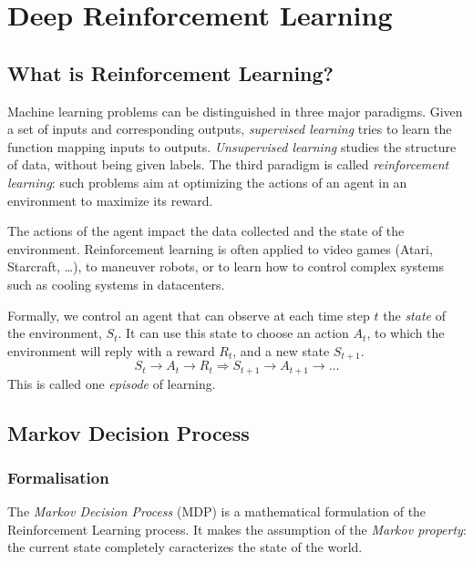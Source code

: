 \section{Deep Reinforcement Learning}
\subsection{What is Reinforcement Learning?}
Machine learning problems can be distinguished in three major paradigms. Given a set of inputs and corresponding outputs, \emph{supervised learning} tries to learn the function mapping inputs to outputs. \emph{Unsupervised learning} studies the structure of data, without being given labels. The third paradigm is called \emph{reinforcement learning}: such problems aim at optimizing the actions of an agent in an environment to maximize its reward.

The actions of the agent impact the data collected and the state of the environment. Reinforcement learning is often applied to video games (Atari, Starcraft, \dots), to maneuver robots, or to learn how to control complex systems such as cooling systems in datacenters.

Formally, we control an agent that can observe at each time step $t$ the \emph{state} of the environment, $S_t$. It can use this state to choose an action $A_t$, to which the environment will reply with a reward $R_t$, and a new state $S_{t+1}$.
\begin{equation*}
    S_t\longrightarrow A_t\longrightarrow R_t \Longrightarrow S_{t+1}\longrightarrow A_{t+1} \longrightarrow \dots
\end{equation*}
This is called one \emph{episode} of learning.

\subsection{Markov Decision Process}
\subsubsection{Formalisation}
The \emph{Markov Decision Process} (MDP) is a mathematical formulation of the Reinforcement Learning process. It makes the assumption of the \emph{Markov property}: the current state completely caracterizes the state of the world.


